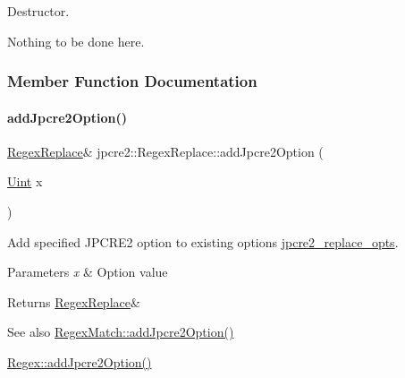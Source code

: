 Destructor. 

Nothing to be done here. 

\subsubsection{Member Function Documentation}
\hypertarget{classjpcre2_1_1RegexReplace_a3f86b1e11d08d0153a08244771e59061_a3f86b1e11d08d0153a08244771e59061}{}\label{classjpcre2_1_1RegexReplace_a3f86b1e11d08d0153a08244771e59061_a3f86b1e11d08d0153a08244771e59061} 
\paragraph{\texorpdfstring{add\+Jpcre2\+Option()}{addJpcre2Option()}}
{\footnotesize\ttfamily \hyperlink{classjpcre2_1_1RegexReplace}{Regex\+Replace}\& jpcre2\+::\+Regex\+Replace\+::add\+Jpcre2\+Option (\begin{DoxyParamCaption}\item[{\hyperlink{namespacejpcre2_a078242d38221a13fb3543b9edd78c099}{Uint}}]{x }\end{DoxyParamCaption})\hspace{0.3cm}{\ttfamily [inline]}}



Add specified J\+P\+C\+R\+E2 option to existing options \hyperlink{classjpcre2_1_1RegexReplace_acf13bcb16918df4b7bcaa7e49a1c7d59}{jpcre2\+\_\+replace\+\_\+opts}. 


\begin{DoxyParams}{Parameters}
{\em x} & Option value \\
\hline
\end{DoxyParams}
\begin{DoxyReturn}{Returns}
\hyperlink{classjpcre2_1_1RegexReplace}{Regex\+Replace}\& 
\end{DoxyReturn}
\begin{DoxySeeAlso}{See also}
\hyperlink{classjpcre2_1_1RegexMatch_a0a4cf8554a7e00f3cf2db34f60a43f60_a0a4cf8554a7e00f3cf2db34f60a43f60}{Regex\+Match\+::add\+Jpcre2\+Option()} 

\hyperlink{classjpcre2_1_1Regex_a03974fa7ba8f7c47186cb8d6f54934de_a03974fa7ba8f7c47186cb8d6f54934de}{Regex\+::add\+Jpcre2\+Option()} 
\end{DoxySeeAlso}
\hypertarget{classjpcre2_1_1RegexReplace_a06a57430f62058822d48722a2a6425d7_a06a57430f62058822d48722a2a6425d7}{}\label{classjpcre2_1_1RegexReplace_a06a57430f62058822d48722a2a6425d7_a06a57430f62058822d48722a2a6425d7} 
